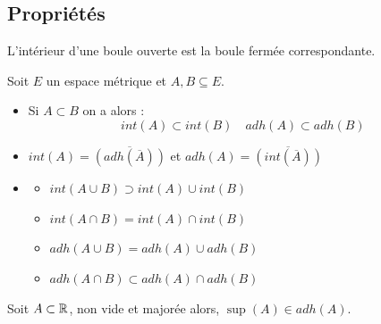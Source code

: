 \subsection{Propriétés}

\begin{proposition}
    L'intérieur d'une boule ouverte est la boule fermée correspondante. 
\end{proposition}

\begin{prop}
    Soit $E$ un espace métrique et $A,B \subseteq E$. 
    \begin{itemize}
        \item Si $A \subset B$ on a alors :
            \[ int(A) \subset int(B) \quad adh(A) \subset adh(B) \] 
        \item $int(A) = \overline{(adh(\overline{A}))} $ et $ adh(A) = \overline{(int(\overline{A}))}$ 
        \item 
        \begin{itemize}
            \item $ int(A \cup B) \supset int(A) \cup int(B) $
            \item $ int(A \cap B) = int(A) \cap int(B) $
            \item $ adh(A \cup B) = adh(A) \cup adh(B) $
            \item $ adh(A \cap B) \subset adh(A) \cap adh(B) $
        \end{itemize}
    \end{itemize}
\end{prop}

\begin{proposition}
    Soit $A \subset \mathbb{R}$, non vide et majorée alors, $\sup (A) \in adh(A)$. 
\end{proposition}





